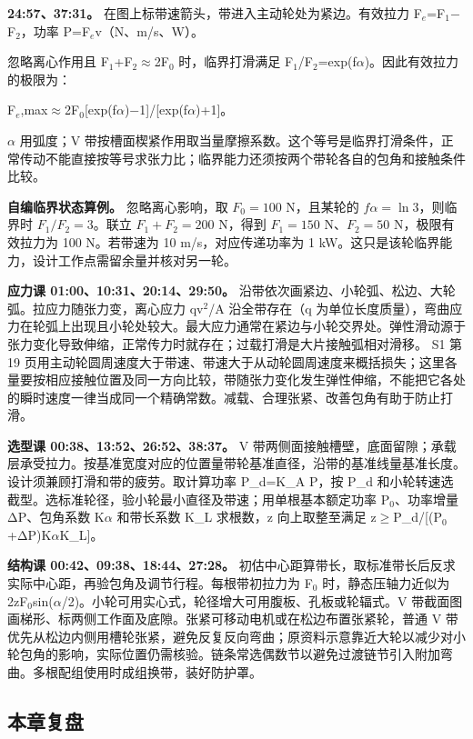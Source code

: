 \documentclass[zihao=5,a4paper,UTF8,fontset=fandol]{ctexart}
\begin{document}
\textbf{24:57、37:31。} 在图上标带速箭头，带进入主动轮处为紧边。有效拉力 F$_{e}$=F$_{1}$$-$F$_{2}$，功率 P=F$_{e}$v（N、m/s、W）。


忽略离心作用且 F$_{1}$+F$_{2}$$\approx$2F$_{0}$ 时，临界打滑满足 F$_{1}$/F$_{2}$=exp(f$\alpha$)。因此有效拉力的极限为：


F$_{e}$,max$\approx$2F$_{0}$[exp(f$\alpha$)$-$1]/[exp(f$\alpha$)+1]。


$\alpha$ 用弧度；V 带按槽面楔紧作用取当量摩擦系数。这个等号是临界打滑条件，正常传动不能直接按等号求张力比；临界能力还须按两个带轮各自的包角和接触条件比较。


\textbf{自编临界状态算例。} 忽略离心影响，取 $F_0=100$ N，且某轮的 $f\alpha=\ln 3$，则临界时 $F_1/F_2=3$。联立 $F_1+F_2=200$ N，得到 $F_1=150$ N、$F_2=50$ N，极限有效拉力为 100 N。若带速为 10 m/s，对应传递功率为 1 kW。这只是该轮临界能力，设计工作点需留余量并核对另一轮。


\textbf{应力课 01:00、10:31、20:14、29:50。} 沿带依次画紧边、小轮弧、松边、大轮弧。拉应力随张力变，离心应力 qv$^{2}$/A 沿全带存在（q 为单位长度质量），弯曲应力在轮弧上出现且小轮处较大。最大应力通常在紧边与小轮交界处。弹性滑动源于张力变化导致伸缩，正常传力时就存在；过载打滑是大片接触弧相对滑移。 S1 第 19 页用主动轮圆周速度大于带速、带速大于从动轮圆周速度来概括损失；这里各量要按相应接触位置及同一方向比较，带随张力变化发生弹性伸缩，不能把它各处的瞬时速度一律当成同一个精确常数。减载、合理张紧、改善包角有助于防止打滑。


\textbf{选型课 00:38、13:52、26:52、38:37。} V 带两侧面接触槽壁，底面留隙；承载层承受拉力。按基准宽度对应的位置量带轮基准直径，沿带的基准线量基准长度。设计须兼顾打滑和带的疲劳。取计算功率 P\_d=K\_A P，按 P\_d 和小轮转速选截型。选标准轮径，验小轮最小直径及带速；用单根基本额定功率 P$_{0}$、功率增量 ΔP、包角系数 K$\alpha$ 和带长系数 K\_L 求根数，z 向上取整至满足 z$\ge$P\_d/[(P$_{0}$+ΔP)K$\alpha$K\_L]。


\textbf{结构课 00:42、09:38、18:44、27:28。} 初估中心距算带长，取标准带长后反求实际中心距，再验包角及调节行程。每根带初拉力为 F$_{0}$ 时，静态压轴力近似为 2zF$_{0}$sin($\alpha$/2)。小轮可用实心式，轮径增大可用腹板、孔板或轮辐式。V 带截面图画梯形、标两侧工作面及底隙。张紧可移动电机或在松边布置张紧轮，普通 V 带优先从松边内侧用槽轮张紧，避免反复反向弯曲；原资料示意靠近大轮以减少对小轮包角的影响，实际位置仍需核验。链条常选偶数节以避免过渡链节引入附加弯曲。多根配组使用时成组换带，装好防护罩。




\subsection{本章复盘}
\end{document}
